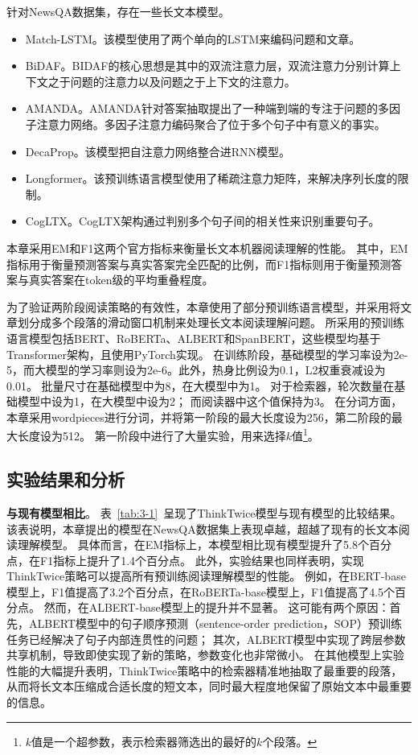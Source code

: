 针对NewsQA数据集，存在一些长文本模型。
\begin{itemize}
    \item Match-LSTM\cite{wang2015learning}。该模型使用了两个单向的LSTM来编码问题和文章。
    \item BiDAF\cite{seo2016bidirectional}。BIDAF的核心思想是其中的双流注意力层，双流注意力分别计算上下文之于问题的注意力以及问题之于上下文的注意力。
    \item AMANDA\cite{kundu2018question}。AMANDA针对答案抽取提出了一种端到端的专注于问题的多因子注意力网络。多因子注意力编码聚合了位于多个句子中有意义的事实。
    \item DecaProp\cite{tay2018densely}。该模型把自注意力网络整合进RNN模\cite{mikolov2010recurrent}型。
    \item Longformer\cite{beltagy2020longformer}。该预训练语言模型使用了稀疏注意力矩阵，来解决序列长度的限制。
    \item CogLTX\cite{ding2020cogltx}。CogLTX架构通过判别多个句子间的相关性来识别重要句子。
\end{itemize}

本章采用EM和F1这两个官方指标来衡量长文本机器阅读理解的性能。
其中，EM指标用于衡量预测答案与真实答案完全匹配的比例，而F1指标则用于衡量预测答案与真实答案在token级的平均重叠程度。

为了验证两阶段阅读策略的有效性，本章使用了部分预训练语言模型，并采用将文章划分成多个段落的滑动窗口机制来处理长文本阅读理解问题。
所采用的预训练语言模型包括BERT\cite{devlin2018bert}、RoBERTa\cite{liu2019roberta}、ALBERT\cite{lan2019albert}和SpanBERT\cite{joshi2020spanbert}，这些模型均基于Transformer\cite{vaswani2017attention}架构，且使用PyTorch实现。
在训练阶段，基础模型的学习率设为2e-5，而大模型的学习率则设为2e-6。此外，热身比例设为0.1，L2权重衰减设为0.01。
批量尺寸在基础模型中为8，在大模型中为1。
对于检索器，轮次数量在基础模型中设为1，在大模型中设为2；
而阅读器中这个值保持为3。
在分词方面，本章采用wordpieces\cite{wu2016google}进行分词，并将第一阶段的最大长度设为256，第二阶段的最大长度设为512。
第一阶段中进行了大量实验，用来选择$k$值\footnote{$k$值是一个超参数，表示检索器筛选出的最好的$k$个段落。}。



\subsection{实验结果和分析}
\textbf{与现有模型相比}。
表~\ref{tab:3-1}~呈现了ThinkTwice模型与现有模型的比较结果。
该表说明，本章提出的模型在NewsQA数据集上表现卓越，超越了现有的长文本阅读理解模型。
具体而言，在EM指标上，本模型相比现有模型提升了5.8个百分点，在F1指标上提升了1.4个百分点。
此外，实验结果也同样表明，实现ThinkTwice策略可以提高所有预训练阅读理解模型的性能。
例如，在BERT-base模型上，F1值提高了3.2个百分点，在RoBERTa-base模型上，F1值提高了4.5个百分点。
然而，在ALBERT-base模型上的提升并不显著。
这可能有两个原因：首先，ALBERT模型中的句子顺序预测（sentence-order prediction，SOP）预训练任务已经解决了句子内部连贯性的问题；
其次，ALBERT模型中实现了跨层参数共享机制，导致即使实现了新的策略，参数变化也非常微小。
在其他模型上实验性能的大幅提升表明，ThinkTwice策略中的检索器精准地抽取了最重要的段落，从而将长文本压缩成合适长度的短文本，同时最大程度地保留了原始文本中最重要的信息。

